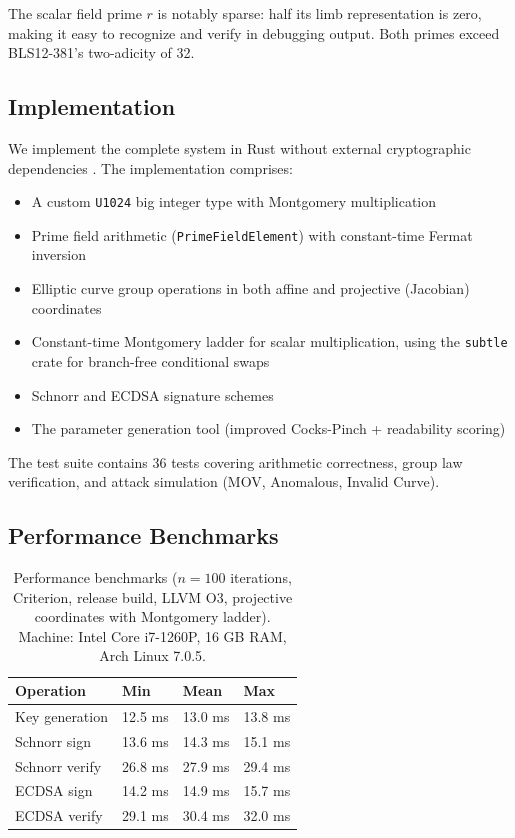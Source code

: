 The scalar field prime \(r\) is notably sparse: half its limb
representation is zero, making it easy to recognize and verify in
debugging output. Both primes exceed BLS12-381's two-adicity of 32.

\subsection{Implementation}\label{implementation}

We implement the complete system in Rust without external cryptographic
dependencies \cite{Curve1024Impl}. The implementation comprises:

\begin{itemize}
\tightlist
\item
  A custom \texttt{U1024} big integer type with Montgomery
  multiplication \cite{Montgomery1985}
\item
  Prime field arithmetic (\texttt{PrimeFieldElement}) with constant-time
  Fermat inversion
\item
  Elliptic curve group operations in both affine and projective
  (Jacobian) coordinates
\item
  Constant-time Montgomery ladder for scalar multiplication, using the
  \texttt{subtle} crate for branch-free conditional swaps
\item
  Schnorr and ECDSA signature schemes
\item
  The parameter generation tool (improved Cocks-Pinch + readability
  scoring)
\end{itemize}

The test suite contains 36 tests covering arithmetic correctness, group
law verification, and attack simulation (MOV, Anomalous, Invalid Curve).

\subsection{Performance Benchmarks}\label{performance-benchmarks}

\begin{table}[t]
\centering
\caption{Performance benchmarks (\(n = 100\) iterations, Criterion, release
build, LLVM O3, projective coordinates with Montgomery ladder). Machine:
Intel Core i7-1260P, 16 GB RAM, Arch Linux 7.0.5.}
\begin{tabular}{llll}
\toprule
Operation & Min & Mean & Max \\
\midrule
Key generation & 12.5 ms & 13.0 ms & 13.8 ms \\
Schnorr sign & 13.6 ms & 14.3 ms & 15.1 ms \\
Schnorr verify & 26.8 ms & 27.9 ms & 29.4 ms \\
ECDSA sign & 14.2 ms & 14.9 ms & 15.7 ms \\
ECDSA verify & 29.1 ms & 30.4 ms & 32.0 ms \\
\bottomrule
\end{tabular}
\end{table}


